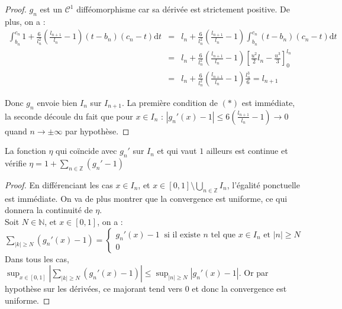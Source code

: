 \documentclass[11pt,a4paper]{article}
\begin{document}
\begin{proof}
$g_n$ est un $\mathcal{C}^1$ difféomorphisme car sa dérivée est strictement positive. De plus, on a :
\begin{eqnarray*}
\int_{b_n}^{c_n} 1 + \frac{6}{l_n^2}(\frac{l_{n+1}}{l_n} -1)(t-b_n)(c_n-t)\mathrm{d}t &=& l_n +  \frac{6}{l_n^2}(\frac{l_{n+1}}{l_n} -1)\int_{b_n}^{c_n} (t-b_n)(c_n-t)\mathrm{d}t \\
&=& l_n +  \frac{6}{l_n^2}(\frac{l_{n+1}}{l_n} -1) \left [\frac{u^2}{2}l_n - \frac{u^3}{3}\right ]^{l_n}_0 \\
&=& l_n +  \frac{6}{l_n^2}(\frac{l_{n+1}}{l_n} -1) \frac{l_n^3}{6} = l_{n+1}
\end{eqnarray*}

Donc $g_n$ envoie bien $I_n$ sur $I_{n+1}$. La première condition de $(*)$ est immédiate, la seconde découle du fait que pour $x\in I_n$ : $ \displaystyle |g_n'(x) -1| \leq 6(\frac{l_{n+1}}{l_n} -1) \to 0 $ quand $n\to \pm \infty$ par hypothèse. 
\end{proof}

\begin{lemma}
La fonction $\eta$ qui coïncide avec $g_n'$ sur $I_n$ et qui vaut $1$ ailleurs est continue et vérifie $\displaystyle \eta =  1 + \sum_{n \in \mathbb{Z}} (g_n'-1)$
\end{lemma}

\begin{proof}
%
%
En différenciant les cas $x \in I_n$, et $\displaystyle x\in [0,1] \setminus \bigcup_{n \in \mathbb{Z}} I_n$, l'égalité ponctuelle est immédiate. On va de plus montrer que la convergence est uniforme, ce qui donnera la continuité de $\eta$. \\ 
Soit $N \in \mathbb{N}$, et $x\in [0,1]$, on a : $\displaystyle \sum_{|k| \geq N} (g_n'(x)-1)= \begin{cases} g_n'(x)-1 \ \text{ si il existe } n \text{ tel que } x\in I_n \text{ et } |n|\geq N\\ 0 \end{cases}$ \\
Dans tous les cas, $\displaystyle \sup_{x\in [0,1]} \left | \sum_{|k| \geq N} (g_n'(x)-1) \right | \leq \sup_{|n| \geq N} |g_n'(x) -1|$. Or par hypothèse sur les dérivées, ce majorant tend vers $0$ et donc la convergence est uniforme. 
\end{proof}
\end{document}
